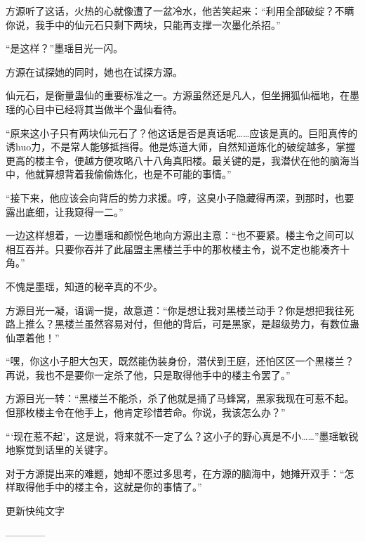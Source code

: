 \begin{this_body}
方源听了这话，火热的心就像遭了一盆冷水，他苦笑起来：“利用全部破绽？不瞒你说，我手中的仙元石只剩下两块，只能再支撑一次墨化杀招。”

“是这样？”墨瑶目光一闪。

方源在试探她的同时，她也在试探方源。

仙元石，是衡量蛊仙的重要标准之一。方源虽然还是凡人，但坐拥狐仙福地，在墨瑶的心目中已经将其当做半个蛊仙看待。

“原来这小子只有两块仙元石了？他这话是否是真话呢……应该是真的。巨阳真传的诱huo力，不是常人能够抵挡得。他是炼道大师，自然知道炼化的破绽越多，掌握更高的楼主令，便越方便攻略八十八角真阳楼。最关键的是，我潜伏在他的脑海当中，他就算想背着我偷偷炼化，也是不可能的事情。”

“接下来，他应该会向背后的势力求援。哼，这臭小子隐藏得再深，到那时，也要露出底细，让我窥得一二。”

一边这样想着，一边墨瑶和颜悦色地向方源出主意：“也不要紧。楼主令之间可以相互吞并。只要你吞并了此届盟主黑楼兰手中的那枚楼主令，说不定也能凑齐十角。”

不愧是墨瑶，知道的秘辛真的不少。

方源目光一凝，语调一提，故意道：“你是想让我对黑楼兰动手？你是想把我往死路上推么？黑楼兰虽然容易对付，但他的背后，可是黑家，是超级势力，有数位蛊仙罩着他！”

“嘿，你这小子胆大包天，既然能伪装身份，潜伏到王庭，还怕区区一个黑楼兰？再说，我也不是要你一定杀了他，只是取得他手中的楼主令罢了。”

方源目光一转：“黑楼兰不能杀，杀了他就是捅了马蜂窝，黑家我现在可惹不起。但那枚楼主令在他手上，他肯定珍惜若命。你说，我该怎么办？”

“‘现在惹不起’，这是说，将来就不一定了么？这小子的野心真是不小……”墨瑶敏锐地察觉到话里的关键字。

对于方源提出来的难题，她却不愿过多思考，在方源的脑海中，她摊开双手：“怎样取得他手中的楼主令，这就是你的事情了。”

更新快纯文字

------------

\end{this_body}

